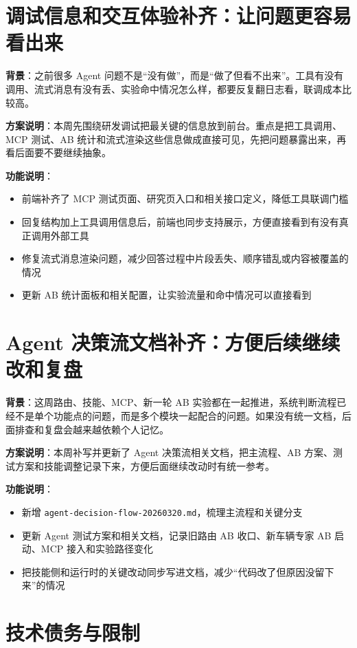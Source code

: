 \documentclass[UTF8]{ctexart}
\begin{document}
\section{调试信息和交互体验补齐：让问题更容易看出来}

\textbf{背景}：之前很多 Agent 问题不是“没有做”，而是“做了但看不出来”。工具有没有调用、流式消息有没有丢、实验命中情况怎么样，都要反复翻日志看，联调成本比较高。

\textbf{方案说明}：本周先围绕研发调试把最关键的信息放到前台。重点是把工具调用、MCP 测试、AB 统计和流式渲染这些信息做成直接可见，先把问题暴露出来，再看后面要不要继续抽象。

\textbf{功能说明}：
\begin{itemize}
\item 前端补齐了 MCP 测试页面、研究页入口和相关接口定义，降低工具联调门槛
\item 回复结构加上工具调用信息后，前端也同步支持展示，方便直接看到有没有真正调用外部工具
\item 修复流式消息渲染问题，减少回答过程中片段丢失、顺序错乱或内容被覆盖的情况
\item 更新 AB 统计面板和相关配置，让实验流量和命中情况可以直接看到
\end{itemize}

\section{Agent 决策流文档补齐：方便后续继续改和复盘}

\textbf{背景}：这周路由、技能、MCP、新一轮 AB 实验都在一起推进，系统判断流程已经不是单个功能点的问题，而是多个模块一起配合的问题。如果没有统一文档，后面排查和复盘会越来越依赖个人记忆。

\textbf{方案说明}：本周补写并更新了 Agent 决策流相关文档，把主流程、AB 方案、测试方案和技能调整记录下来，方便后面继续改动时有统一参考。

\textbf{功能说明}：
\begin{itemize}
\item 新增 \texttt{agent-decision-flow-20260320.md}，梳理主流程和关键分支
\item 更新 Agent 测试方案和相关文档，记录旧路由 AB 收口、新车辆专家 AB 启动、MCP 接入和实验路径变化
\item 把技能侧和运行时的关键改动同步写进文档，减少“代码改了但原因没留下来”的情况
\end{itemize}

\section{技术债务与限制}
\end{document}
